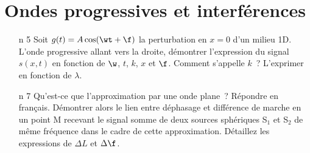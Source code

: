 \documentclass[a4paper, 10pt, final, garamond]{book}
\begin{document}
\setcounter{chapter}{12}


\chapter{Ondes progressives et interférences}

\begin{enumerate}[label=\sqenumi]
	\item[n]{5}%
	      Soit $g (t) = A \cos(\wt+\f)$ la perturbation en $x=0$ d'un milieu 1D.
	      L'onde progressive allant vers la droite, démontrer l'expression du
	      signal $s (x,t)$ en fonction de $\w$, $t$, $k$, $x$ et $\f$. Comment
	      s'appelle $k$~? L'exprimer en fonction de $\lambda$.
	      \smallbreak
	\item[n]{7}%
	      Qu'est-ce que l'approximation par une onde plane~? Répondre en français.
	      Démontrer alors le lien entre déphasage et différence de marche en un
	      point M recevant le signal somme de deux sources sphériques S$_1$ et
	      S$_2$ de même fréquence dans le cadre de cette approximation. Détaillez
	      les expressions de
	      $\Delta{L}$ et $\Delta\f$.
	      \smallbreak
\end{enumerate}
\end{document}
